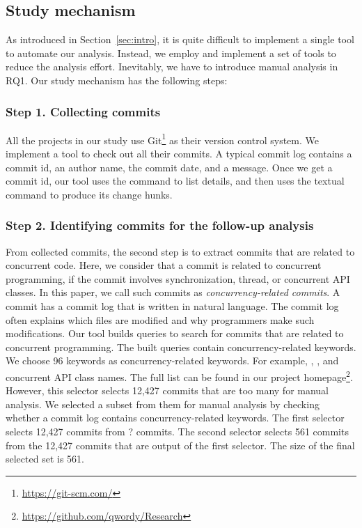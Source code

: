 \subsection{Study mechanism}
\label{sec:method:tool}
As introduced in Section~\ref{sec:intro}, it is quite difficult to implement a single tool to automate our analysis. Instead, we employ and implement a set of tools to reduce the analysis effort. Inevitably, we have to introduce manual analysis in RQ1. Our study mechanism has the following steps:

\subsubsection{Step 1. Collecting commits} All the projects in our study use Git\footnote{\url{https://git-scm.com/}} as their version control system. We implement a tool to check out all their commits. A typical commit log contains a commit id, an author name, the commit date, and a message. Once we get a commit id, our tool uses the  command to list details, and then uses the textual  command to produce its change hunks.

\subsubsection{Step 2. Identifying commits for the follow-up analysis} From collected commits, the second step is to extract commits that are related to concurrent code. Here, we consider that a commit is related to concurrent programming, if the commit involves synchronization, thread, or concurrent API classes. In this paper, we call such commits as \emph{concurrency-related commits}. A commit has a commit log that is written in natural language. The commit log often explains which files are modified and why programmers make such modifications. Our tool builds queries to search for commits that are related to concurrent programming. The built queries contain concurrency-related keywords. We choose 96 keywords as concurrency-related keywords. For example, , , and concurrent API class names. The full list can be found in our project homepage\footnote{\url{https://github.com/qwordy/Research}}. However, this selector selects 12,427 commits that are too many for manual analysis. We selected a subset from them for manual analysis by checking whether a commit log contains concurrency-related keywords. The first selector selects 12,427 commits from ? commits. The second selector selects 561 commits from the 12,427 commits that are output of the first selector. The size of the final selected set is 561.


